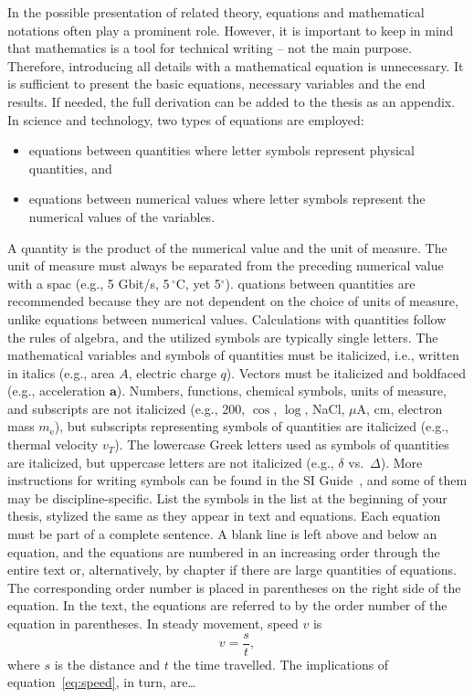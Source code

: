 In the possible presentation of related theory, equations and
mathematical notations often play a prominent role. However, it is
important to keep in mind that mathematics is a tool for technical
writing – not the main purpose. Therefore, introducing all details
with a mathematical equation is unnecessary. It is sufficient to
present the basic equations, necessary variables and the end
results. If needed, the full derivation can be added to the thesis as
an appendix. In science and technology, two types of equations are
employed:

\begin{itemize}
\item{equations between quantities where letter symbols represent physical quantities, and}
\item{equations between numerical values where letter symbols represent the numerical values of the variables.}
\end{itemize}

A quantity is the product of the numerical value and the unit of
measure. The unit of measure must always be separated from the
preceding numerical value with a spac (e.g., 5 Gbit/s,  5\,$^\circ$C, yet 5$^\circ$).
quations between quantities are recommended because they are not dependent on the choice of units of measure, unlike equations between numerical values. Calculations with quantities follow the rules of algebra, and the utilized symbols are typically single letters. The mathematical variables and symbols of quantities must be italicized, i.e., written in italics (e.g., area $A$, electric charge $q$). Vectors must be italicized and boldfaced (e.g., acceleration $\mathbf{a}$).
Numbers, functions, chemical symbols, units of measure, and subscripts are not italicized (e.g., 200, $\cos$, $\log$, NaCl, $\mu$A, cm, electron mass $m_\mathrm{e}$), but subscripts representing symbols of quantities are italicized (e.g., thermal velocity $v_\mathit{T}$). The lowercase Greek letters used as symbols of quantities are italicized, but uppercase letters are not italicized (e.g., $\delta$ vs.\ $\Delta$). More instructions for writing symbols can be found in the SI Guide~\cite{SIguide}, and some of them may be discipline-specific.
List the symbols in the list at the beginning of your thesis, stylized the same as they appear in text and equations. Each equation must be part of a complete sentence. A blank line is left above and below an equation, and the equations are numbered in an increasing order through the entire text or, alternatively, by chapter if there are large quantities of equations. The corresponding order number is placed in parentheses on the right side of the equation. In the text, the equations are referred to by the order number of the equation in parentheses.
In steady movement, speed $v$ is
\begin{equation}
    v = \frac{s}{t},
    \label{eq:speed}
\end{equation}
where $s$ is the distance and $t$ the time travelled. The implications of equation~\eqref{eq:speed}, in turn, are\ldots

